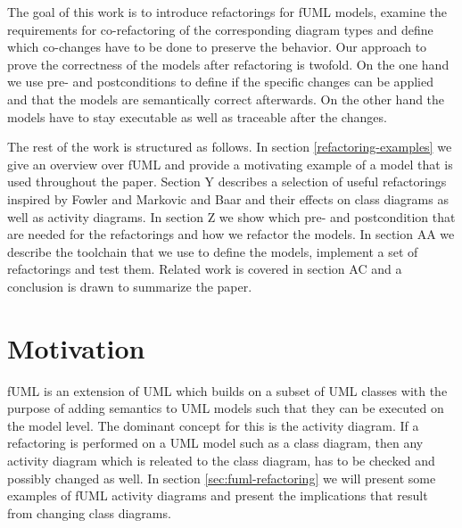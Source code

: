 \documentclass{llncs}
\begin{document}

The goal of this work is to introduce refactorings for fUML models, examine the requirements for co-refactoring of the
corresponding diagram types and define which co-changes have to be done to preserve the behavior. Our approach to prove
the correctness of the models after refactoring is twofold. On the one hand we use pre- and postconditions
\cite{rob99} to define if the specific changes can be applied and that the models are semantically correct afterwards.
On the other hand the models have to stay executable as well as traceable after the changes.



The rest of the work is structured as follows. In section \ref{refactoring-examples} we give an overview over fUML and provide
a motivating
example of a model that is used throughout the paper. Section Y describes a selection of useful refactorings inspired by
Fowler \cite{fow99} and Markovic and Baar \cite{DBLP:journals/sosym/MarkovicB08} and their effects on class diagrams as
well as activity diagrams. In section Z we show which pre- and postcondition that are needed for the refactorings and
how we refactor the models. In section AA we describe the toolchain that we use to define the models, implement a set of
refactorings and test them. Related work is covered in section AC and a conclusion is drawn to summarize the paper.



\section{Motivation}
fUML is an extension of UML which builds on a subset of UML classes with the purpose of adding semantics to UML models such that they can
be executed on the model level. The dominant concept for this is the activity diagram. If a refactoring is performed on a UML model such
as a class diagram, then any activity diagram which is releated to the class diagram, has to be checked and possibly changed as well. In
section \ref{sec:fuml-refactoring} we will present some examples of fUML activity diagrams and present the implications that result from
changing class diagrams.
\end{document}

